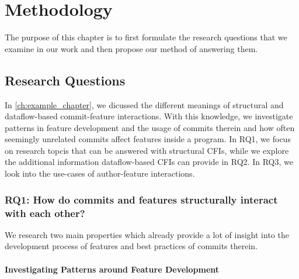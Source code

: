 \chapter{Methodology}\label{ch:methodology}

The purpose of this chapter is to first formulate the research questions that we examine in our work and then propose our method of answering them.

\section{Research Questions}\label{sec:research_questions}

In \autoref{ch:example_chapter}, we dicussed the different meanings of structural and dataflow-based commit-feature interactions.
With this knowledge, we investigate patterns in feature development and the usage of commits therein and how often seemingly unrelated commits affect features inside a program.
In RQ1, we focus on research topcis that can be answered with structural CFIs, while we explore the additional information dataflow-based CFIs can provide in RQ2.
In RQ3, we look into the use-cases of author-feature interactions.

\subsection[RQ1: How do commits and features structurally interact with each other?]{\textbf{RQ1}: How do commits and features structurally interact with each other?}\label{sec:meth:RQ1}

We research two main properties which already provide a lot of insight into the development process of features and best practices of commits therein.

\subsubsection*{Investigating Patterns around Feature Development}

